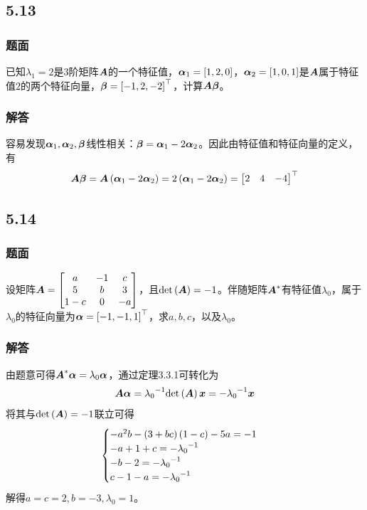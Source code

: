 \documentclass{beamer}
\begin{document}
\subsection*{5.13}
\begin{frame}
    \frametitle{题面}
    已知\(\lambda_1=2\)是\(3\)阶矩阵\(\boldsymbol{A}\)的一个特征值，\(\boldsymbol{\alpha}_1=\left[ 1,2,0 \right]\)，\(\boldsymbol{\alpha}_2=\left[ 1,0,1 \right]\)是\(\boldsymbol{A}\)属于特征值\(2\)的两个特征向量，\(\boldsymbol{\beta}=\left[ -1,2,-2 \right]^\top\)，计算\(\boldsymbol{A}\boldsymbol{\beta}\)。
\end{frame}

\begin{frame}
    \frametitle{解答}
    容易发现\(\boldsymbol{\alpha}_1,\boldsymbol{\alpha}_2,\boldsymbol{\beta}\)线性相关：\(\boldsymbol{\beta}=\boldsymbol{\alpha}_1-2\boldsymbol{\alpha}_2\)。因此由特征值和特征向量的定义，有
    \begin{equation*}
        \boldsymbol{A}\boldsymbol{\beta}=\boldsymbol{A}\left( \boldsymbol{\alpha}_1-2\boldsymbol{\alpha}_2 \right)=2\left( \boldsymbol{\alpha}_1-2\boldsymbol{\alpha}_2 \right)=\begin{bmatrix}2&4&-4\end{bmatrix}^\top
    \end{equation*}
\end{frame}

\subsection*{5.14}
\begin{frame}
    \frametitle{题面}
    设矩阵\(\boldsymbol{A}=\begin{bmatrix}a&-1&c\\5&b&3\\1-c&0&-a\end{bmatrix}\)，且\(\mathrm{det}\left( \boldsymbol{A} \right)=-1\)。伴随矩阵\(\boldsymbol{A}^*\)有特征值\(\lambda_0\)，属于\(\lambda_0\)的特征向量为\(\boldsymbol{\alpha}=\left[ -1,-1,1 \right]^\top\)，求\(a,b,c\)，以及\(\lambda_0\)。
\end{frame}

\begin{frame}
    \frametitle{解答}
    由题意可得\(\boldsymbol{A}^*\boldsymbol{\alpha}=\lambda_0\boldsymbol{\alpha}\)，通过定理3.3.1可转化为
    \begin{equation*}
        \boldsymbol{A}\boldsymbol{\alpha}={\lambda_0}^{-1}\mathrm{det}\left( \boldsymbol{A} \right)\boldsymbol{x}=-{\lambda_0}^{-1}\boldsymbol{x}
    \end{equation*}
    \pause
    将其与\(\mathrm{det}\left( \boldsymbol{A} \right)=-1\)联立可得
    \begin{equation*}
        \begin{cases}
            -a^2b-\left( 3+bc \right)\left( 1-c \right)-5a=-1 \\
            -a+1+c=-{\lambda_0}^{-1}           \\
            -b-2=-{\lambda_0}^{-1}             \\
            c-1-a=-{\lambda_0}^{-1}
        \end{cases}
    \end{equation*}
    \pause
    解得\(a=c=2,b=-3,\lambda_0=1\)。
\end{frame}
\end{document}
